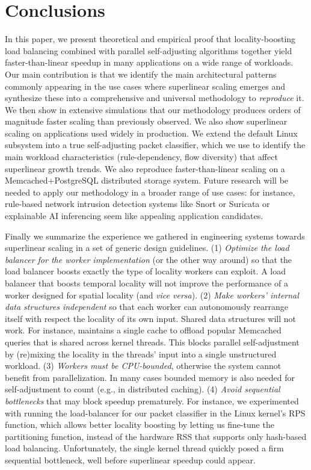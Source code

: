 \section{Conclusions}\label{sec:conclusions}

In this paper, we present theoretical and empirical proof that locality-boosting load balancing combined with parallel self-adjusting algorithms together yield faster-than-linear speedup in many applications on a wide range of workloads. Our main contribution is that we identify the main architectural patterns commonly appearing in the use cases where superlinear scaling emerges and synthesize these into a comprehensive and universal methodology to \emph{reproduce} it.  We then show in extensive simulations that our methodology produces orders of magnitude faster scaling than previously observed. We also show superlinear scaling on applications used widely in production. We extend the default \nftables Linux subsystem into a true self-adjusting packet classifier, which we use to identify the main workload characteristics (rule-dependency, flow diversity) that affect superlinear growth trends.  We also reproduce faster-than-linear scaling on a Memcached+PostgreSQL distributed storage system. Future research will be needed to apply our methodology in a broader range of use cases: for instance, rule-based network intrusion detection systems like Snort or Suricata \cite{10.5555/2537857.2537883} or explainable AI inferencing seem like appealing application candidates.

Finally we summarize the experience we gathered in engineering systems towards superlinear scaling in a set of generic design guidelines. (1) \emph{Optimize the load balancer for the worker implementation} (or the other way around) so that the load balancer boosts exactly the type of locality workers can exploit. A load balancer that boosts temporal locality will not improve the performance of a worker designed for spatial locality (and \emph{vice versa}). (2) \emph{Make workers' internal data structures independent} so that each worker can autonomously rearrange itself with respect the locality of its own input. Shared data structures will not work. For instance, \cite{ghigoff2021bmc} maintains a single cache to offload popular Memcached queries that is shared across kernel threads. This blocks parallel self-adjustment by (re)mixing the locality in the threads' input into a single unstructured workload. (3) \emph{Workers must be CPU-bounded}, otherwise the system cannot benefit from parallelization. In many cases bounded memory is also needed for self-adjustment to count (e.g., in distributed caching). (4) \emph{Avoid sequential bottlenecks} that may block speedup prematurely. For instance, we experimented with running the load-balancer for our packet classifier in the Linux kernel's RPS function, which allows better locality boosting by letting us fine-tune the partitioning function, instead of the hardware RSS that supports only hash-based load balancing. Unfortunately, the single kernel thread quickly posed a firm sequential bottleneck, well before superlinear speedup could appear.



